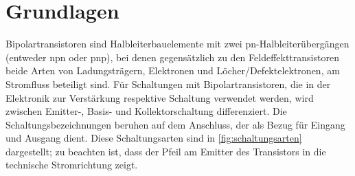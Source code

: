 \documentclass[12pt,english,ngerman]{scrartcl}
\begin{document}

\tableofcontents
\newpage




 





\section{Grundlagen}\label{sec:Grundlagen}

Bipolartransistoren sind Halbleiterbauelemente mit zwei pn-Halbleiterübergängen
(entweder npn oder pnp), bei denen gegensätzlich zu den Feldeffekttransistoren
beide Arten von Ladungsträgern, Elektronen und Löcher/Defektelektronen, am
Stromfluss beteiligt sind. Für Schaltungen mit Bipolartransistoren, die in der
Elektronik zur Verstärkung respektive Schaltung verwendet werden, wird zwischen
Emitter-, Basis- und Kollektorschaltung differenziert. Die
Schaltungsbezeichnungen beruhen auf dem Anschluss, der als Bezug für Eingang
und Ausgang dient. Diese Schaltungsarten sind in 
\autoref{fig:schaltungsarten} dargestellt; zu beachten ist, dass der Pfeil am
Emitter des Transistors in die technische Stromrichtung zeigt. 
\end{document}
